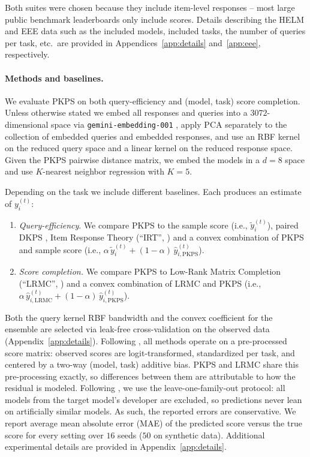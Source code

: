 \documentclass{article}
\theoremstyle{definition}
\theoremstyle{remark}
\theoremstyle{plain}
\newcommand{\PKPS}{PKPS\xspace}
\begin{document}
Both suites were chosen because they include item-level responses -- most large
public benchmark leaderboards only include scores.
Details describing the HELM and EEE data such as the included models, included
tasks, the number of queries per task, etc.\ are provided in
Appendices~\ref{app:details} and~\ref{app:eee}, respectively.

\paragraph{Methods and baselines.} We evaluate \PKPS on both query-efficiency and
(model, task) score completion.
Unless otherwise stated we embed all responses and queries into a $3072$-dimensional
space via \texttt{gemini-embedding-001} \citep{lee2025gemini}, apply PCA separately to the collection of embedded queries and embedded responses, and use an RBF kernel on the
reduced query space and a linear kernel on the reduced response space.
Given the \PKPS pairwise distance matrix, we embed the models in a $d = 8$ space and
use $K$-nearest neighbor regression with $K = 5$.

Depending on the task we include different baselines. Each produces an estimate of
$y_{i}^{(t)}$:
\begin{enumerate}[wide, labelwidth=1pt, labelindent=12pt]
    \item \emph{Query-efficiency}. We compare \PKPS to the sample score (i.e.,
    $\tilde{y}_{i}^{(t)}$), paired DKPS \citep{dkps_qeff}, Item Response Theory
    (``IRT'', \citealp{polo2024tinybenchmarks}) and a convex combination
    of \PKPS and sample score (i.e.,
    $\alpha\,\tilde{y}_{i}^{(t)}+(1-\alpha)\,\hat{y}^{(t)}_{i,\mathrm{PKPS}}$).
    \item \emph{Score completion.} We compare \PKPS to Low-Rank Matrix Completion
    (``LRMC'', \citealp{benchpress}) and a convex combination of LRMC and \PKPS
    (i.e., $\alpha\,\hat{y}^{(t)}_{i,\mathrm{LRMC}}+(1-\alpha)\,\hat{y}^{(t)}_{i,\mathrm{PKPS}}$).
\end{enumerate}
Both the query kernel RBF bandwidth and the convex coefficient for the ensemble are
selected via leak-free cross-validation on the observed data (Appendix~\ref{app:details}).
Following \citet{benchpress}, all methods operate on a pre-processed score matrix:
observed scores are logit-transformed, standardized per task, and centered by a
two-way (model, task) additive bias.
\PKPS and LRMC share this pre-processing exactly, so differences between them are
attributable to how the residual is modeled.
Following \citet{dkps_qeff}, we use the leave-one-family-out protocol: all models from the
target model's developer are excluded, so predictions never lean on artificially similar models. As such, the reported errors are conservative.
We report average mean absolute error (MAE) of the predicted score versus the true
score for every setting over $16$ seeds ($50$ on synthetic data).
Additional experimental details are provided in Appendix~\ref{app:details}.
\end{document}
